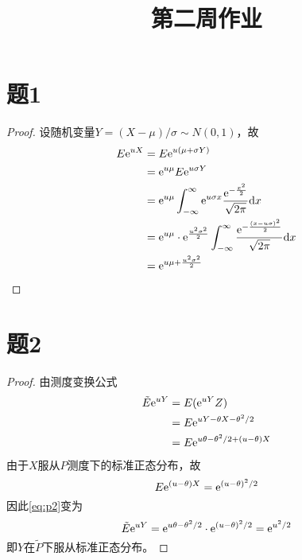 \documentclass[cn]{homework}
\title{第二周作业}
\begin{document}
    \maketitle

    \section{题1}
    \begin{proof}
    设随机变量$Y=(X-\mu)/\sigma\sim N(0,1)$，故
    \begin{align*}
        E\mathrm e^{uX}&=E\mathrm e^{u(\mu+\sigma Y)}\\
                &=\mathrm e^{u\mu}E\mathrm e^{u\sigma Y}\\
                &=\mathrm e^{u\mu}
                    \int_{-\infty}^\infty
                      \mathrm e^{u\sigma x}\frac{\mathrm e^{-\frac{x^2}{2}}}{\sqrt{2\pi}}
                    \mathrm d x\\
                &=\mathrm e^{u\mu}\cdot\mathrm e^\frac{u^2\sigma^2}{2}
                    \int_{-\infty}^\infty
                    \frac{\mathrm e^{-\frac{(x-u\sigma)^2}{2}}}{\sqrt{2\pi}}
                    \mathrm d x\\
                &=\mathrm e^{u\mu+\frac{u^2\sigma^2}{2}}
    \end{align*}
    \end{proof}

    \section{题2}
    \begin{proof}
        由测度变换公式
        \begin{equation}
            \label{eq:p2}
            \begin{aligned}
            \tilde E\mathrm e^{uY}&=E(\mathrm e^{uY}Z)\\
                           &=E\mathrm e^{uY-\theta X-\theta^2/2}\\
                           &=E\mathrm e^{u\theta-\theta^2/2+(u-\theta)X}
            \end{aligned}
        \end{equation}
        由于$X$服从$P$测度下的标准正态分布，故
        \[E\mathrm e^{(u-\theta)X}=\mathrm e^{(u-\theta)^2/2}\]
        因此\cref{eq:p2}变为
        \[\tilde E\mathrm e^{uY}=\mathrm e^{u\theta-\theta^2/2}
        \cdot\mathrm e^{(u-\theta)^2/2}=\mathrm e^{u^2/2}\]
        即$Y$在$\tilde P$下服从标准正态分布。
    \end{proof}
\end{document}
